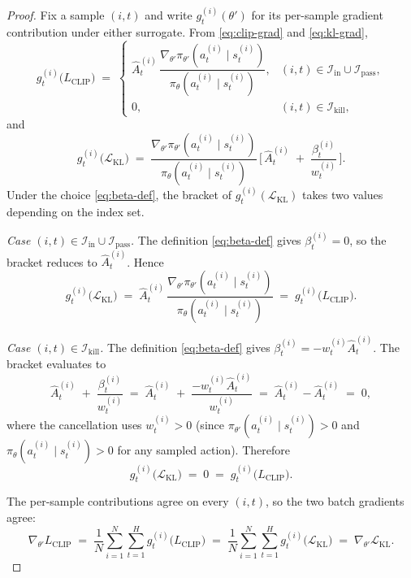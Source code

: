 \documentclass{article}
\begin{document}
\begin{proof}
Fix a sample $(i,t)$ and write $g_t^{(i)}(\theta')$ for its
per-sample gradient contribution under either surrogate. From
\eqref{eq:clip-grad} and \eqref{eq:kl-grad},
\[
g_t^{(i)}\bigl(L_{\mathrm{CLIP}}\bigr)
\;=\;
\begin{cases}
\hat{A}_t^{(i)}\,
\dfrac{\nabla_{\theta'} \pi_{\theta'}\!\left(a_t^{(i)} \mid s_t^{(i)}\right)}
      {\pi_\theta\!\left(a_t^{(i)} \mid s_t^{(i)}\right)},
  & (i,t) \in \mathcal{I}_{\mathrm{in}} \cup \mathcal{I}_{\mathrm{pass}}, \\[12pt]
0,
  & (i,t) \in \mathcal{I}_{\mathrm{kill}},
\end{cases}
\]
and
\[
g_t^{(i)}\bigl(\mathcal{L}_{\mathrm{KL}}\bigr)
\;=\;
\frac{\nabla_{\theta'} \pi_{\theta'}\!\left(a_t^{(i)} \mid s_t^{(i)}\right)}
     {\pi_\theta\!\left(a_t^{(i)} \mid s_t^{(i)}\right)}\,
\Biggl[\,\hat{A}_t^{(i)} \;+\; \frac{\beta_t^{(i)}}{w_t^{(i)}}\,\Biggr].
\]
Under the choice \eqref{eq:beta-def}, the bracket of
$g_t^{(i)}(\mathcal{L}_{\mathrm{KL}})$ takes two values depending on
the index set.

\emph{Case $(i,t) \in \mathcal{I}_{\mathrm{in}} \cup
\mathcal{I}_{\mathrm{pass}}$.} The definition
\eqref{eq:beta-def} gives $\beta_t^{(i)} = 0$, so the bracket
reduces to $\hat{A}_t^{(i)}$. Hence
\[
g_t^{(i)}\bigl(\mathcal{L}_{\mathrm{KL}}\bigr)
\;=\;
\hat{A}_t^{(i)}\,
\frac{\nabla_{\theta'} \pi_{\theta'}\!\left(a_t^{(i)} \mid s_t^{(i)}\right)}
     {\pi_\theta\!\left(a_t^{(i)} \mid s_t^{(i)}\right)}
\;=\;
g_t^{(i)}\bigl(L_{\mathrm{CLIP}}\bigr).
\]

\emph{Case $(i,t) \in \mathcal{I}_{\mathrm{kill}}$.} The definition
\eqref{eq:beta-def} gives $\beta_t^{(i)} = -w_t^{(i)}\hat{A}_t^{(i)}$.
The bracket evaluates to
\[
\hat{A}_t^{(i)} \;+\; \frac{\beta_t^{(i)}}{w_t^{(i)}}
\;=\;
\hat{A}_t^{(i)} \;+\;
\frac{-w_t^{(i)}\hat{A}_t^{(i)}}{w_t^{(i)}}
\;=\;
\hat{A}_t^{(i)} - \hat{A}_t^{(i)}
\;=\; 0,
\]
where the cancellation uses $w_t^{(i)} > 0$ (since
$\pi_{\theta'}\!\left(a_t^{(i)} \mid s_t^{(i)}\right) > 0$ and
$\pi_\theta\!\left(a_t^{(i)} \mid s_t^{(i)}\right) > 0$ for any
sampled action). Therefore
\[
g_t^{(i)}\bigl(\mathcal{L}_{\mathrm{KL}}\bigr)
\;=\; 0
\;=\;
g_t^{(i)}\bigl(L_{\mathrm{CLIP}}\bigr).
\]

The per-sample contributions agree on every $(i,t)$, so the two
batch gradients agree:
\[
\nabla_{\theta'} L_{\mathrm{CLIP}}
\;=\;
\frac{1}{N}\sum_{i=1}^{N}\sum_{t=1}^{H} g_t^{(i)}\bigl(L_{\mathrm{CLIP}}\bigr)
\;=\;
\frac{1}{N}\sum_{i=1}^{N}\sum_{t=1}^{H} g_t^{(i)}\bigl(\mathcal{L}_{\mathrm{KL}}\bigr)
\;=\;
\nabla_{\theta'}\mathcal{L}_{\mathrm{KL}}.
\]
\end{proof}
\end{document}
